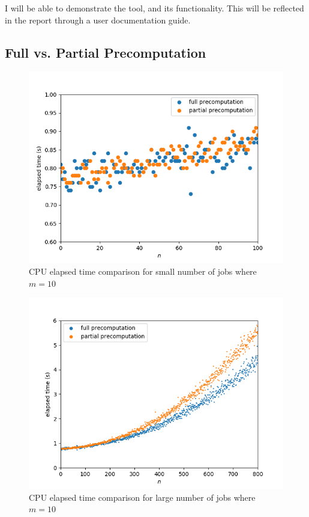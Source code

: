 I will be able to demonstrate the tool, and its functionality. This will be reflected in the report through a user documentation guide.

\subsection{Full vs. Partial Precomputation}

\begin{figure}[H]
	\centering
	\includegraphics[scale=0.6]{figures/precomputation_cpu_small}
	\caption{CPU elapsed time comparison for small number of jobs where $m=10$}
\end{figure}

\begin{figure}[H]
	\centering
	\includegraphics[scale=0.6]{figures/precomputation_cpu_big}
	\caption{CPU elapsed time comparison for large number of jobs where $m=10$}
\end{figure}

